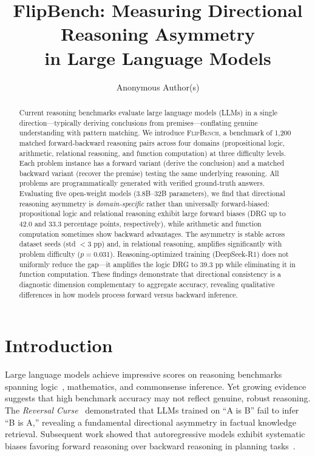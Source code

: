 \documentclass{article}
\title{FlipBench: Measuring Directional Reasoning Asymmetry\\in Large Language Models}
\author{
  Anonymous Author(s)
}
\newcommand{\flipbench}{\textsc{FlipBench}\xspace}
\begin{document}
\maketitle

\begin{abstract}
Current reasoning benchmarks evaluate large language models (LLMs) in a single direction---typically deriving conclusions from premises---conflating genuine understanding with pattern matching. We introduce \flipbench, a benchmark of 1,200 matched forward-backward reasoning pairs across four domains (propositional logic, arithmetic, relational reasoning, and function computation) at three difficulty levels. Each problem instance has a forward variant (derive the conclusion) and a matched backward variant (recover the premise) testing the same underlying reasoning. All problems are programmatically generated with verified ground-truth answers. Evaluating five open-weight models (3.8B--32B parameters), we find that directional reasoning asymmetry is \emph{domain-specific} rather than universally forward-biased: propositional logic and relational reasoning exhibit large forward biases (DRG up to 42.0 and 33.3 percentage points, respectively), while arithmetic and function computation sometimes show backward advantages. The asymmetry is stable across dataset seeds (std $< 3$ pp) and, in relational reasoning, amplifies significantly with problem difficulty ($p = 0.031$). Reasoning-optimized training (DeepSeek-R1) does not uniformly reduce the gap---it amplifies the logic DRG to 39.3 pp while eliminating it in function computation. These findings demonstrate that directional consistency is a diagnostic dimension complementary to aggregate accuracy, revealing qualitative differences in how models process forward versus backward inference.
\end{abstract}

\section{Introduction}

Large language models achieve impressive scores on reasoning benchmarks spanning logic~\citep{parmar2024logicbench}, mathematics, and commonsense inference. Yet growing evidence suggests that high benchmark accuracy may not reflect genuine, robust reasoning. The \emph{Reversal Curse}~\citep{berglund2024reversal} demonstrated that LLMs trained on ``A is B'' fail to infer ``B is A,'' revealing a fundamental directional asymmetry in factual knowledge retrieval. Subsequent work showed that autoregressive models exhibit systematic biases favoring forward reasoning over backward reasoning in planning tasks~\citep{ren2025thinking}.
\end{document}
